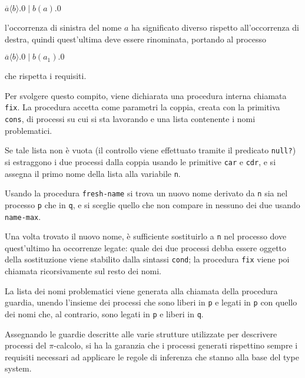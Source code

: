 \begin{pilisting}
$
    \overline{a}\langle b\rangle.0 \; | \;
    b(a).0
$
\end{pilisting}

l'occorrenza di sinistra del nome $a$ ha significato diverso rispetto
all'occorrenza di destra, quindi quest'ultima deve essere rinominata,
portando al processo

\begin{pilisting}
$
    \overline{a}\langle b\rangle.0 \; | \;
    b(a_1).0
$
\end{pilisting}

che rispetta i requisiti.

Per svolgere questo compito, viene dichiarata una procedura interna
chiamata \lstinline{fix}. La procedura accetta come parametri la coppia,
creata con la primitiva \lstinline{cons}, di processi su cui si sta
lavorando e una lista contenente i nomi problematici.

Se tale lista non \`e vuota (il controllo viene effettuato tramite il
predicato \lstinline{null?}) si estraggono i due processi dalla coppia
usando le primitive \lstinline{car} e \lstinline{cdr}, e si assegna il
primo nome della lista alla variabile \lstinline{n}.

Usando la procedura \lstinline{fresh-name} si trova un nuovo nome
derivato da \lstinline{n} sia nel processo \lstinline{p} che in
\lstinline{q}, e si sceglie quello che non compare in nessuno dei due
usando \lstinline{name-max}.

Una volta trovato il nuovo nome, \`e sufficiente sostituirlo a
\lstinline{n} nel processo dove quest'ultimo ha occorrenze legate: quale
dei due processi debba essere oggetto della sostituzione viene stabilito
dalla sintassi \lstinline{cond}; la procedura \lstinline{fix} viene poi
chiamata ricorsivamente sul resto dei nomi.

La lista dei nomi problematici viene generata alla chiamata della
procedura guardia, unendo l'insieme dei processi che sono liberi in
\lstinline{p} e legati in \lstinline{p} con quello dei nomi che, al
contrario, sono legati in \lstinline{p} e liberi in \lstinline{q}.

Assegnando le guardie descritte alle varie strutture utilizzate per
descrivere processi del $\pi$-calcolo, si ha la garanzia che i processi
generati rispettino sempre i requisiti necessari ad applicare le
regole di inferenza che stanno alla base del type system.
